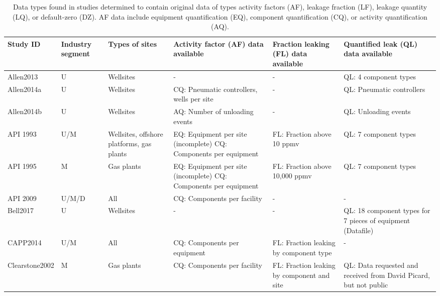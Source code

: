 \documentclass[11pt]{report}
\begin{document}
{{{{\begin{landscape}
\begin{table}[]
\begin{scriptsize}
\caption{Data types found in studies determined to contain original data of types activity factors (AF), leakage fraction (LF), leakage quantity (LQ), or default-zero (DZ). AF data include equipment quantification (EQ), component quantification (CQ), or activity quantification (AQ). }
\label{tab:VF_component_data_by_study}
\begin{tabular*}{1\columnwidth}{p{}p{}p{}p{}p{}p{}}
\toprule
Study ID   			& Industry segment    & Types of sites        	& Activity factor (AF) data available  		& Fraction leaking (FL) data available      					& Quantified leak (QL) data available   \\
\midrule
Allen2013  		& U        			& Wellsites    			& -      							& - 												& QL: 4 component types       \\
Allen2014a         	& U         			& Wellsites    			& CQ: Pneumatic controllers, wells per site       & - 									& QL: Pneumatic controllers   \\
Allen2014b        	& U         			& Wellsites    			& AQ: Number of unloading events       	& - 												& QL: Unloading events        \\
API 1993         		& U/M       		& Wellsites, offshore platforms, gas plants  & EQ: Equipment per site (incomplete) CQ: Components per equipment   & FL: Fraction above 10 ppmv  & QL: 7 component types        \\
API 1995        		& M        			& Gas plants   			& EQ: Equipment per site (incomplete) CQ: Components per equipment  &FL: Fraction above 10,000 ppmv      & QL: 7 component types        \\
API 2009         		& U/M/D     		& All					& CQ: Components per facility			& - 												& -       \\
Bell2017         		& U         			& Wellsites   			& -      							& - 												& QL: 18 component types for 7 pieces of equipment (Datafile)         \\
CAPP2014      		& U/M      			& All         				& CQ: Components per equipment      	& FL: Fraction leaking by component type   				& -       \\
Clearstone2002       	& M         			& Gas plants   			& CQ: Components per facility			& FL: Fraction leaking by component and site				& QL: Data requested and received from David Picard, but not public \\

\end{tabular*}
\end{scriptsize}
\end{table}
\end{landscape}}}}}
\end{document}
